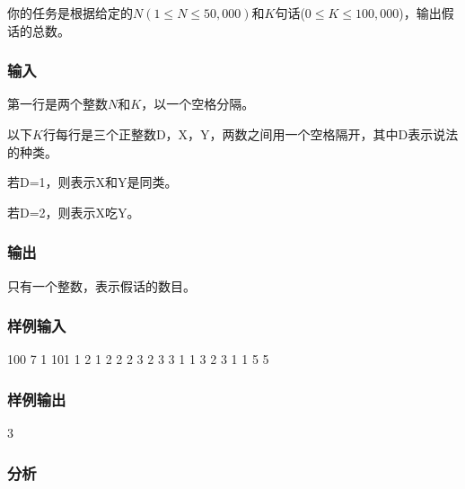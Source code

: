 你的任务是根据给定的$N(1 \leq N \leq 50,000)$和$K$句话($0 \leq K \leq 100,000$)，输出假话的总数。 

\subsubsection{输入}
第一行是两个整数$N$和$K$，以一个空格分隔。 

以下$K$行每行是三个正整数D，X，Y，两数之间用一个空格隔开，其中D表示说法的种类。
\begindot
\item 若D=1，则表示X和Y是同类。 
\item 若D=2，则表示X吃Y。
\myenddot

\subsubsection{输出}
只有一个整数，表示假话的数目。

\subsubsection{样例输入}
\begin{Code}
100 7
1 101 1 
2 1 2
2 2 3 
2 3 3 
1 1 3 
2 3 1 
1 5 5
\end{Code}

\subsubsection{样例输出}
\begin{Code}
3
\end{Code}

\subsubsection{分析}


